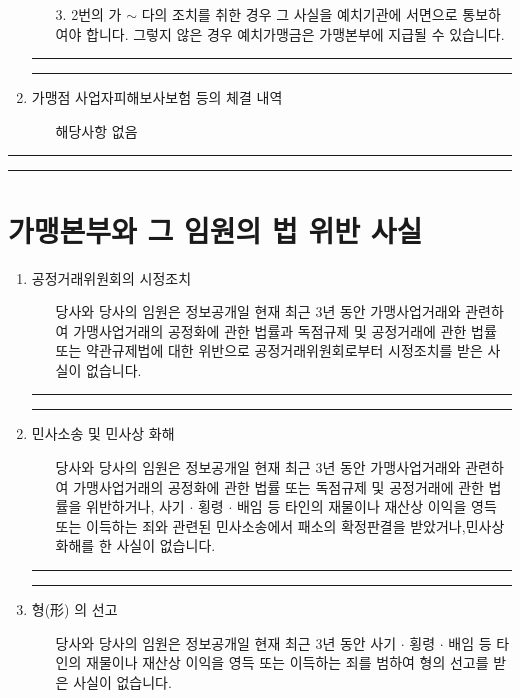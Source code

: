 \documentclass[a5paper,10pt]{oblivoir}
\newcommand\crule[3][black]{\textcolor{#1}{\rule{#2}{#3}}}
\begin{document}
\begin{enumerate}
\begin{enumerate}
\begin{itemize}
\end{itemize}
\item[3.]2번의  가 $\sim$  다의 조치를 취한 경우 그 사실을 예치기관에 서면으로 통보하여야 합니다. 그렇지 않은 경우 예치가맹금은 가맹본부에 지급될 수 있습니다.
\end{enumerate}
\newpage
\begin{center}
\crule[red]{4cm}{0.1cm} \crule[blue]{4cm}{0.1cm}
\end{center}
\item 가맹점 사업자피해보사보험  등의 체결 내역
\begin{itemize}
\item[]  해당사항 없음
\end{itemize}
\end{enumerate}

\newpage
\begin{center}
\crule[red]{4cm}{0.1cm} \crule[blue]{4cm}{0.1cm}
\end{center}

\section{ 가맹본부와 그 임원의 법 위반 사실}
\begin{enumerate}
\item 공정거래위원회의 시정조치
\begin{itemize}
\item[]당사와 당사의 임원은 정보공개일 현재 최근 3년 동안 가맹사업거래와 관련하여 가맹사업거래의 공정화에 관한 법률과 독점규제 및 공정거래에 관한 법률 또는 약관규제법에 대한 위반으로 공정거래위원회로부터 시정조치를 받은 사실이 없습니다.
\end{itemize}
\newpage
\begin{center}
\crule[red]{4cm}{0.1cm} \crule[blue]{4cm}{0.1cm}
\end{center}
\item 민사소송 및 민사상 화해
\begin{itemize}
\item[]당사와 당사의 임원은 정보공개일 현재 최근 3년 동안 가맹사업거래와 관련하여 가맹사업거래의 공정화에 관한 법률 또는 독점규제 및 공정거래에 관한 법률을 위반하거나,  사기 $\cdot$ 횡령 $\cdot$ 배임 등 타인의 재물이나 재산상 이익을 영득 또는 이득하는 죄와 관련된 민사소송에서 패소의 확정판결을 받았거나,민사상 화해를 한 사실이 없습니다.
\end{itemize}
\newpage
\begin{center}
\crule[red]{4cm}{0.1cm} \crule[blue]{4cm}{0.1cm}
\end{center}
\item 형(形) 의 선고
\begin{itemize}
\item[]당사와 당사의 임원은 정보공개일 현재 최근 3년 동안  사기 $\cdot$ 횡령 $\cdot$ 배임 등 타인의 재물이나 재산상 이익을 영득 또는 이득하는  죄를 범하여 형의 선고를 받은 사실이 없습니다.
\end{itemize}
\end{enumerate}
\end{document}
